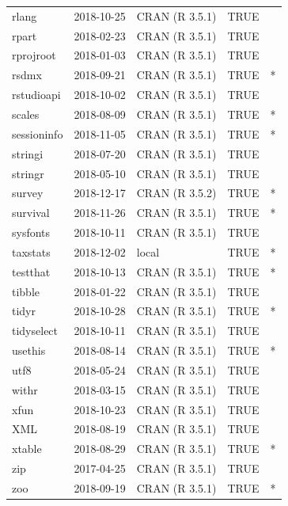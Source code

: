 \documentclass{grattan}\usepackage[]{graphicx}\usepackage[]{color}
\begin{document}
\begin{longtable}{lllll}
  rlang & 2018-10-25 & CRAN (R 3.5.1) & TRUE &  \\ 
  rpart & 2018-02-23 & CRAN (R 3.5.1) & TRUE &  \\ 
  rprojroot & 2018-01-03 & CRAN (R 3.5.1) & TRUE &  \\ 
  rsdmx & 2018-09-21 & CRAN (R 3.5.1) & TRUE & * \\ 
  rstudioapi & 2018-10-02 & CRAN (R 3.5.1) & TRUE &  \\ 
  scales & 2018-08-09 & CRAN (R 3.5.1) & TRUE & * \\ 
  sessioninfo & 2018-11-05 & CRAN (R 3.5.1) & TRUE & * \\ 
  stringi & 2018-07-20 & CRAN (R 3.5.1) & TRUE &  \\ 
  stringr & 2018-05-10 & CRAN (R 3.5.1) & TRUE &  \\ 
  survey & 2018-12-17 & CRAN (R 3.5.2) & TRUE & * \\ 
  survival & 2018-11-26 & CRAN (R 3.5.1) & TRUE & * \\ 
  sysfonts & 2018-10-11 & CRAN (R 3.5.1) & TRUE &  \\ 
  taxstats & 2018-12-02 & local & TRUE & * \\ 
  testthat & 2018-10-13 & CRAN (R 3.5.1) & TRUE & * \\ 
  tibble & 2018-01-22 & CRAN (R 3.5.1) & TRUE &  \\ 
  tidyr & 2018-10-28 & CRAN (R 3.5.1) & TRUE & * \\ 
  tidyselect & 2018-10-11 & CRAN (R 3.5.1) & TRUE &  \\ 
  usethis & 2018-08-14 & CRAN (R 3.5.1) & TRUE & * \\ 
  utf8 & 2018-05-24 & CRAN (R 3.5.1) & TRUE &  \\ 
  withr & 2018-03-15 & CRAN (R 3.5.1) & TRUE &  \\ 
  xfun & 2018-10-23 & CRAN (R 3.5.1) & TRUE &  \\ 
  XML & 2018-08-19 & CRAN (R 3.5.1) & TRUE &  \\ 
  xtable & 2018-08-29 & CRAN (R 3.5.1) & TRUE & * \\ 
  zip & 2017-04-25 & CRAN (R 3.5.1) & TRUE &  \\ 
  zoo & 2018-09-19 & CRAN (R 3.5.1) & TRUE & * \\ 
   \bottomrule
\end{longtable}


\clearpage
\end{document}
